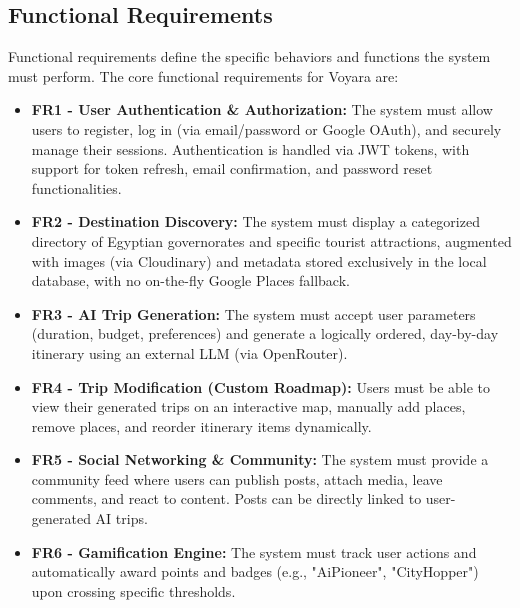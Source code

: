 \subsection{Functional Requirements}
Functional requirements define the specific behaviors and functions the system must perform. The core functional requirements for Voyara are:
\begin{itemize}
    \item \textbf{FR1 - User Authentication \& Authorization:} The system must allow users to register, log in (via email/password or Google OAuth), and securely manage their sessions. Authentication is handled via JWT tokens, with support for token refresh, email confirmation, and password reset functionalities.
    \item \textbf{FR2 - Destination Discovery:} The system must display a categorized directory of Egyptian governorates and specific tourist attractions, augmented with images (via Cloudinary) and metadata stored exclusively in the local database, with no on-the-fly Google Places fallback.
    \item \textbf{FR3 - AI Trip Generation:} The system must accept user parameters (duration, budget, preferences) and generate a logically ordered, day-by-day itinerary using an external LLM (via OpenRouter).
    \item \textbf{FR4 - Trip Modification (Custom Roadmap):} Users must be able to view their generated trips on an interactive map, manually add places, remove places, and reorder itinerary items dynamically.
    \item \textbf{FR5 - Social Networking \& Community:} The system must provide a community feed where users can publish posts, attach media, leave comments, and react to content. Posts can be directly linked to user-generated AI trips.
    \item \textbf{FR6 - Gamification Engine:} The system must track user actions and automatically award points and badges (e.g., "AiPioneer", "CityHopper") upon crossing specific thresholds.
\end{itemize}

